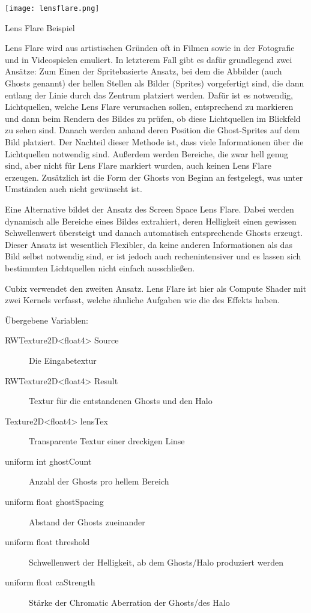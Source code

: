 \texttt{[image: lensflare.png]}
\caption{Lens Flare Beispiel}
\label{img:lensFlareImg}

Lens Flare wird aus artistischen Gründen oft in Filmen sowie in der Fotografie und in Videospielen emuliert. In letzterem Fall gibt es dafür grundlegend zwei Ansätze: Zum Einen der Spritebasierte Ansatz, bei dem die Abbilder (auch Ghosts genannt) der hellen Stellen als Bilder (Sprites) vorgefertigt sind, die dann entlang der Linie durch das Zentrum platziert werden. Dafür ist es notwendig, Lichtquellen, welche Lens Flare verursachen sollen, entsprechend zu markieren und dann beim Rendern des Bildes zu prüfen, ob diese Lichtquellen im Blickfeld zu sehen sind. Danach werden anhand deren Position die Ghost-Sprites auf dem Bild platziert. Der Nachteil dieser Methode ist, dass viele Informationen über die Lichtquellen notwendig sind. Au{\ss}erdem werden Bereiche, die zwar hell genug sind, aber nicht für Lens Flare markiert wurden, auch keinen Lens Flare erzeugen. Zusätzlich ist die Form der Ghosts von Beginn an festgelegt, was unter Umständen auch nicht gewünscht ist.

Eine Alternative bildet der Ansatz des Screen Space Lens Flare. Dabei werden dynamisch alle Bereiche eines Bildes extrahiert, deren Helligkeit einen gewissen Schwellenwert übersteigt und danach automatisch entsprechende Ghosts erzeugt. Dieser Ansatz ist wesentlich Flexibler, da keine anderen Informationen als das Bild selbst notwendig sind, er ist jedoch auch rechenintensiver und es lassen sich bestimmten Lichtquellen nicht einfach ausschlie{\ss}en.

Cubix verwendet den zweiten Ansatz. Lens Flare ist hier als Compute Shader mit zwei Kernels verfasst, welche ähnliche Aufgaben wie die des  Effekts haben. 

Übergebene Variablen:
\begin{description}
\item[RWTexture2D<float4> Source] Die Eingabetextur
\item[RWTexture2D<float4> Result] Textur für die entstandenen Ghosts und den Halo
\item[Texture2D<float4> lensTex] Transparente Textur einer dreckigen Linse
\item[uniform int ghostCount] Anzahl der Ghosts pro hellem Bereich
\item[uniform float ghostSpacing] Abstand der Ghosts zueinander
\item[uniform float threshold] Schwellenwert der Helligkeit, ab dem Ghosts/Halo produziert werden
\item[uniform float caStrength] Stärke der Chromatic Aberration der Ghosts/des Halo
\end{description}

